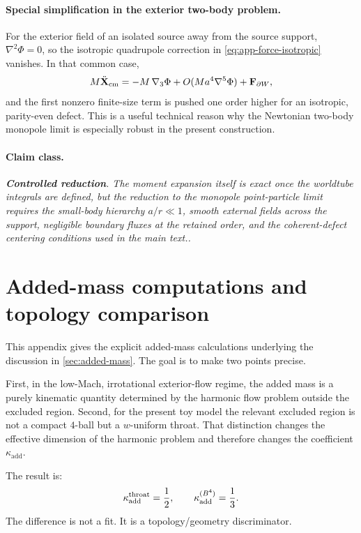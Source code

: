 \documentclass[11pt]{article}
\newcommand{\gradThree}{\nabla_3}
\newcommand{\kadd}{\kappa_{\mathrm{add}}}
\newcommand{\PhiN}{\Phi}
\newcommand{\Controlled}{\textbf{Controlled reduction}}
\newcommand{\claimclass}[1]{\paragraph{Claim class.}\emph{#1.}}
\begin{document}
\paragraph{Special simplification in the exterior two-body problem.}
For the exterior field of an isolated source away from the source support,
\(\nabla^2\PhiN=0\), so the isotropic quadrupole correction in
\eqref{eq:app-force-isotropic} vanishes. In that common case,
\begin{equation}
M\ddot{\mathbf X}_{\rm cm}
=
- M\,\gradThree\PhiN
+
O(Ma^4\nabla^5\PhiN)
+
\mathbf F_{\partial W},
\label{eq:app-cm-eom-harmonic}
\end{equation}
and the first nonzero finite-size term is pushed one order higher for an isotropic,
parity-even defect. This is a useful technical reason why the Newtonian two-body monopole
limit is especially robust in the present construction.

\claimclass{\Controlled. The moment expansion itself is exact once the worldtube integrals
are defined, but the reduction to the monopole point-particle limit requires the small-body
hierarchy \(a/r\ll 1\), smooth external fields across the support, negligible boundary
fluxes at the retained order, and the coherent-defect centering conditions used in the
main text.}

\section{Added-mass computations and topology comparison}
\label{app:added-mass}

This appendix gives the explicit added-mass calculations underlying the discussion in
\cref{sec:added-mass}. The goal is to make two points precise.

First, in the low-Mach, irrotational exterior-flow regime, the added mass is a purely
kinematic quantity determined by the harmonic flow problem outside the excluded region.
Second, for the present toy model the relevant excluded region is not a compact \(4\)-ball
but a \(w\)-uniform throat. That distinction changes the effective dimension of the
harmonic problem and therefore changes the coefficient \(\kadd\).

The result is:
\begin{equation}
\kadd^{\rm throat}=\frac12,
\qquad
\kadd^{(B^4)}=\frac13.
\label{eq:app-kadd-results}
\end{equation}
The difference is not a fit. It is a topology/geometry discriminator.
\end{document}
